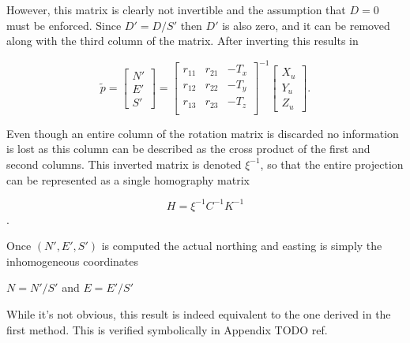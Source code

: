   However, this matrix is clearly not invertible and the assumption that $D=0$ must be enforced.  Since $D'=D/S'$ then $D'$ is also zero, and it can be removed along with the third column of the matrix.   After inverting this results in 
  
  \[
    \tilde{p} =
    \begin{bmatrix} N' \\ E' \\ S' \end{bmatrix}
      = 
    \begin{bmatrix} r_{11} & r_{21} & -T_x \\
                    r_{12} & r_{22} & -T_y \\
                    r_{13} & r_{23} & -T_z \\
    \end{bmatrix}^{-1}
    \begin{bmatrix} X_u \\ Y_u \\ Z_u \end{bmatrix}
  .
  \]
 
  Even though an entire column of the rotation matrix is discarded no information is lost as this column can be described as the cross product of the first and second columns.  This inverted matrix is denoted $\xi^{-1}$, so that the entire projection can be represented as a single homography matrix
  
 \[ 
 H = \xi^{-1} C^{-1} K^{-1} 
 \].
 
 Once $(N',E',S')$ is computed the actual northing and easting is simply the inhomogeneous coordinates
 
 \begin{center}
 $N=N'/S'$ and $E=E'/S'$
 \end{center}
 
 While it's not obvious, this result is indeed equivalent to the one derived in the first method.  This is verified symbolically in Appendix {TODO ref}.  
